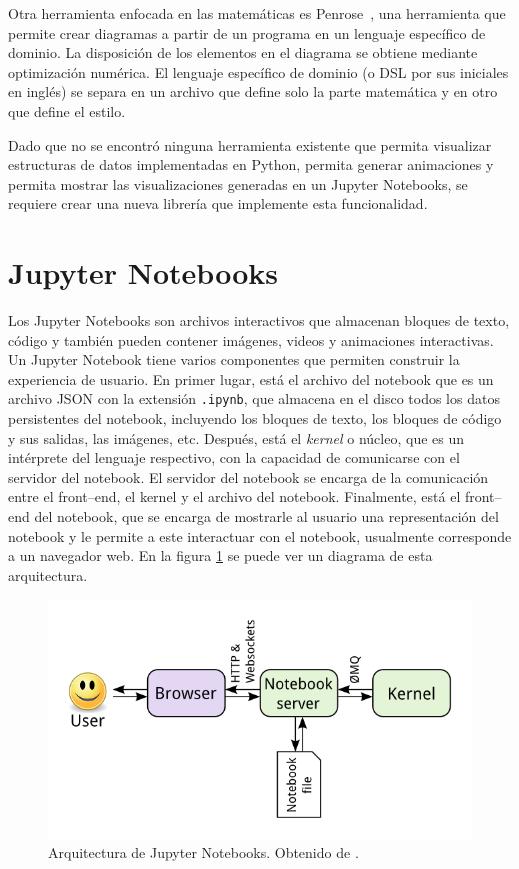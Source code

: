Otra herramienta enfocada en las matemáticas es Penrose~\cite{Penrose}, una herramienta que permite crear diagramas a partir de un programa en un lenguaje específico de dominio. La disposición de los elementos en el diagrama se obtiene mediante optimización numérica. El lenguaje específico de dominio (o DSL por sus iniciales en inglés) se separa en un archivo que define solo la parte matemática y en otro que define el estilo.

Dado que no se encontró ninguna herramienta existente que permita visualizar estructuras de datos implementadas en Python, permita generar animaciones y permita mostrar las visualizaciones generadas en un Jupyter Notebooks, se requiere crear una nueva librería que implemente esta funcionalidad.

\section{Jupyter Notebooks}

Los Jupyter Notebooks son archivos interactivos que almacenan bloques de texto, código y también pueden contener imágenes, videos y animaciones interactivas. Un Jupyter Notebook tiene varios componentes que permiten construir la experiencia de usuario. En primer lugar, está el archivo del notebook que es un archivo JSON con la extensión \texttt{.ipynb}, que almacena en el disco todos los datos persistentes del notebook, incluyendo los bloques de texto, los bloques de código y sus salidas, las imágenes, etc. Después, está el \textit{kernel} o núcleo, que es un intérprete del lenguaje respectivo, con la capacidad de comunicarse con el servidor del notebook. El servidor del notebook se encarga de la comunicación entre el front--end, el kernel y el archivo del notebook. Finalmente, está el front--end del notebook, que se encarga de mostrarle al usuario una representación del notebook y le permite a este interactuar con el notebook, usualmente corresponde a un navegador web. En la figura \ref{fig:notebook_arq} se puede ver un diagrama de esta arquitectura.

\begin{figure}[h]
  \centering
  \includegraphics[width=0.8\linewidth]{imagenes/notebook/notebook_components}
  \caption[Arquitectura de Jupyter Notebooks]{Arquitectura de Jupyter Notebooks. Obtenido de \cite{arq-notebook}.}
  \label{fig:notebook_arq}
\end{figure}

